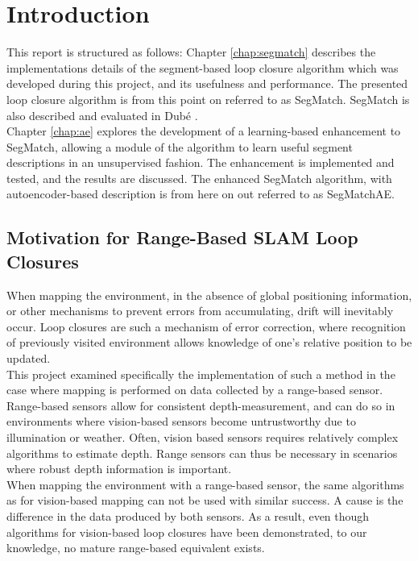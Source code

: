 \chapter{Introduction}
\label{sec:introduction}

This report is structured as follows: Chapter \ref{chap:segmatch} describes the implementations details of the segment-based loop closure algorithm which was developed during this project, and its usefulness and performance. The presented loop closure algorithm is from this point on referred to as SegMatch. SegMatch is also described and evaluated in Dubé \cite{segmatch}.\\

Chapter \ref{chap:ae} explores the development of a learning-based enhancement to SegMatch, allowing a module of the algorithm to learn useful segment descriptions in an unsupervised fashion. The enhancement is implemented and tested, and the results are discussed. The enhanced SegMatch algorithm, with autoencoder-based description is from here on out referred to as SegMatchAE.\\

\section{Motivation for Range-Based SLAM Loop Closures}
\label{sec:motivation}

When mapping the environment, in the absence of global positioning information, or other mechanisms to prevent errors from accumulating, drift will inevitably occur. Loop closures are such a mechanism of error correction, where recognition of previously visited environment allows knowledge of one's relative position to be updated.\\ 

This project examined specifically the implementation of such a method in the case where mapping is performed on data collected by a range-based sensor.\\

Range-based sensors allow for consistent depth-measurement, and can do so in environments where vision-based sensors become untrustworthy due to illumination or weather. Often, vision based sensors requires relatively complex algorithms to estimate depth. Range sensors can thus be necessary in scenarios where robust depth information is important.\\

When mapping the environment with a range-based sensor, the same algorithms as for vision-based mapping can not be used with similar success. A cause is the difference in the data produced by both sensors. As a result, even though algorithms for vision-based loop closures have been demonstrated, to our knowledge, no mature range-based equivalent exists.\\


